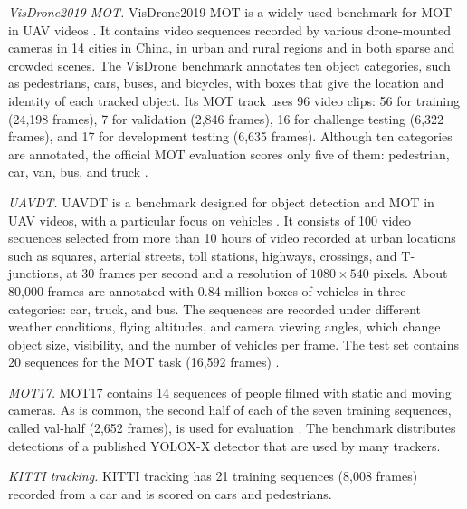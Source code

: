 \emph{VisDrone2019-MOT.} VisDrone2019-MOT is a widely used benchmark for MOT in UAV videos \cite{zhu2022visdrone}. It contains video sequences recorded by various drone-mounted cameras in 14 cities in China, in urban and rural regions and in both sparse and crowded scenes. The VisDrone benchmark annotates ten object categories, such as pedestrians, cars, buses, and bicycles, with boxes that give the location and identity of each tracked object. Its MOT track uses 96 video clips: 56 for training (24,198 frames), 7 for validation (2,846 frames), 16 for challenge testing (6,322 frames), and 17 for development testing (6,635 frames). Although ten categories are annotated, the official MOT evaluation scores only five of them: pedestrian, car, van, bus, and truck \cite{zhu2022visdrone}.

\emph{UAVDT.} UAVDT is a benchmark designed for object detection and MOT in UAV videos, with a particular focus on vehicles \cite{du2018uavdt}. It consists of 100 video sequences selected from more than 10 hours of video recorded at urban locations such as squares, arterial streets, toll stations, highways, crossings, and T-junctions, at 30 frames per second and a resolution of $1080\times540$ pixels. About 80,000 frames are annotated with 0.84 million boxes of vehicles in three categories: car, truck, and bus. The sequences are recorded under different weather conditions, flying altitudes, and camera viewing angles, which change object size, visibility, and the number of vehicles per frame. The test set contains 20 sequences for the MOT task (16,592 frames) \cite{du2018uavdt}.

\emph{MOT17.} MOT17 \cite{milan2016mot16} contains 14 sequences of people filmed with static and moving cameras. As is common, the second half of each of the seven training sequences, called val-half (2,652 frames), is used for evaluation \cite{zhang2022bytetrack}. The benchmark distributes detections of a published YOLOX-X detector \cite{ge2021yolox} that are used by many trackers.

\emph{KITTI tracking.} KITTI tracking \cite{geiger2012kitti} has 21 training sequences (8,008 frames) recorded from a car and is scored on cars and pedestrians.

